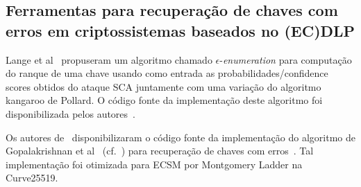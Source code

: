 \subsection{Ferramentas para recuperação de chaves com erros em criptossistemas baseados no (EC)DLP}

Lange et al~\cite{LangeVredendaalWakker2014} propuseram um algoritmo chamado $\epsilon$-\textit{enumeration} para computação do ranque de uma chave usando como entrada as probabilidades/confidence scores obtidos do ataque SCA juntamente com uma variação do algoritmo kangaroo de Pollard. O código fonte da implementação deste algoritmo foi disponibilizada pelos autores~\cite{Vrendendaal-keyrecv-sckangaroo}.

Os autores de~\cite{Nascimento2016_SAC} disponibilizaram o código fonte da implementação do algoritmo de Gopalakrishnan et al~\cite{Gopalakrishnan2007} (cf.~) para recuperação de chaves com erros~\cite{Nascimento-github-ecc-keyrecv}. Tal implementação foi otimizada para ECSM por Montgomery Ladder na Curve25519.

